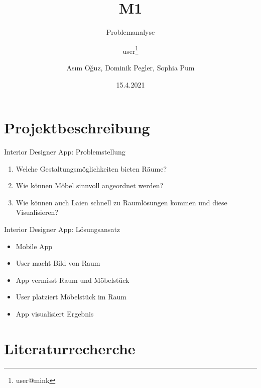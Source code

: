 \documentclass[presentation,bigger,aspectratio=169]{beamer}
\author{user\thanks{user@mink}}
\date{15.4.2021}
\title{M1}
\subtitle{Problemanalyse}
\author[A.Oğuz, D.Pegler, S.Pum]{Asım Oğuz, Dominik Pegler, Sophia Pum}
\institute{Universität Wien, Fakultät für Informatik (SS2021)}
\begin{document}
\maketitle

\section{Projektbeschreibung}
\label{sec:org31c47ef}
\begin{frame}[label={sec:orgd22aaa1}]{\vspace{2.2cm}\begin{center}\MakeUppercase{\insertsection}\end{center}}
\end{frame}

\begin{frame}[label={sec:org5dc3d9f}]{Interior Designer App: Problemstellung}
\begin{enumerate}
\item Welche Gestaltungsmöglichkeiten bieten Räume?
\item Wie können Möbel sinnvoll angeordnet werden?
\item Wie können auch Laien schnell zu Raumlösungen kommen und diese
Visualisieren?
\end{enumerate}
\end{frame}
\begin{frame}[label={sec:org3fe3e80}]{Interior Designer App: Lösungsansatz}
\begin{itemize}
\item Mobile App
\item User macht Bild von Raum
\item App vermisst Raum und Möbelstück
\item User platziert Möbelstück im Raum
\item App visualisiert Ergebnis
\end{itemize}
\end{frame}

\section{Literaturrecherche}
\label{sec:orgcc2d48d}
\begin{frame}[label={sec:org631cb0d}]{\vspace{2.2cm}\begin{center}\MakeUppercase{\insertsection}\end{center}}
\end{frame}
\end{document}
